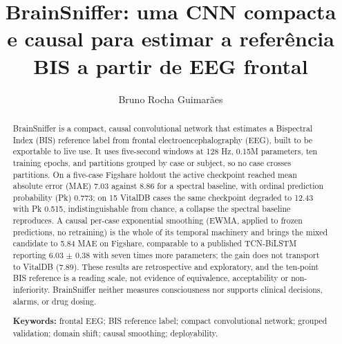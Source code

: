\documentclass[12pt]{article}
\title{BrainSniffer: uma CNN compacta e causal para estimar a referência BIS a partir de EEG frontal}
\author{Bruno Rocha Guimarães\inst{1}}
\begin{document}
\maketitle

\begin{abstract}
BrainSniffer is a compact, causal convolutional network that estimates a Bispectral Index (BIS) reference label from frontal electroencephalography (EEG), built to be exportable to live use. It uses five-second windows at 128 Hz, 0.15M parameters, ten training epochs, and partitions grouped by case or subject, so no case crosses partitions. On a five-case Figshare holdout the active checkpoint reached mean absolute error (MAE) 7.03 against 8.86 for a spectral baseline, with ordinal prediction probability (Pk) 0.773; on 15 VitalDB cases the same checkpoint degraded to 12.43 with Pk 0.515, indistinguishable from chance, a collapse the spectral baseline reproduces. A causal per-case exponential smoothing (EWMA, applied to frozen predictions, no retraining) is the whole of its temporal machinery and brings the mixed candidate to 5.84 MAE on Figshare, comparable to a published TCN-BiLSTM reporting 6.03 $\pm$ 0.38 with seven times more parameters; the gain does not transport to VitalDB (7.89). These results are retrospective and exploratory, and the ten-point BIS reference is a reading scale, not evidence of equivalence, acceptability or non-inferiority. BrainSniffer neither measures consciousness nor supports clinical decisions, alarms, or drug dosing.

\textbf{Keywords:} frontal EEG; BIS reference label; compact convolutional network; grouped validation; domain shift; causal smoothing; deployability.
\end{abstract}
\end{document}
